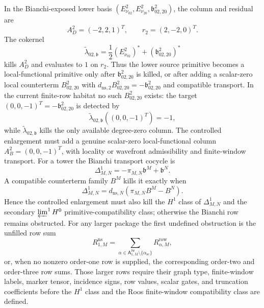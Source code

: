 \begin{stmt}
\begin{enumerate}[label=(\arabic*)]
\[    \]
    In the Bianchi-exposed lower basis
    \((E^2_{\nu_{02}},E^2_{\nu_{20}},\mathfrak b^2_{02,20})\), the column
    and residual are
    \[
      A_D^2=(-2,2,1)^T,\qquad r_2=(2,-2,0)^T .
    \]
    The cokernel
    \[
      \widetilde\lambda_{02,\mathfrak b}
      =
      \frac12(E^2_{\nu_{02}})^*
      +(\mathfrak b^2_{02,20})^*
    \]
    kills \(A_D^2\) and evaluates to \(1\) on \(r_2\).  Thus the lower
    source primitive becomes a local-functional primitive only after
    \(\mathfrak b^2_{02,20}\) is killed, or after adding a scalar-zero
    local counterterm \(B^2_{02,20}\) with
    \(d_{\mathrm{ns},2}B^2_{02,20}=-\mathfrak b^2_{02,20}\) and
    compatible transport.  In the current finite-row habitat no such
    \(B^2_{02,20}\) exists: the target
    \((0,0,-1)^T=-\mathfrak b^2_{02,20}\) is detected by
    \[
      \widetilde\lambda_{02,\mathfrak b}((0,0,-1)^T)=-1,
    \]
    while \(\widetilde\lambda_{02,\mathfrak b}\) kills the only available
    degree-zero column.  The controlled enlargement must add a genuine
    scalar-zero local-functional column
    \(A_B^2=(0,0,-1)^T\), with locality or wavefront admissibility and
    finite-window transport.  For a tower the Bianchi transport cocycle is
    \[
      \Delta^1_{M,N}
      =
      -\pi_{M,N}\mathfrak b^M+\mathfrak b^N .
    \]
    A compatible counterterm family \(B^M\) kills it exactly when
    \[
      \Delta^1_{M,N}
      =
      d_{\mathrm{ns},N}(\pi_{M,N}B^M-B^N).
    \]
    Hence the controlled enlargement must also kill the \(H^1\) class of
    \(\Delta^1_{M,N}\) and the secondary
    \(\varprojlim^1H^0\) primitive-compatibility class; otherwise the
    Bianchi row remains obstructed.
    For any larger package the first undefined obstruction is the
    unfilled row sum
    \[
      R^{\mathrm{ns}}_{1,M}
      =
      \sum_{\alpha\in
      \mathsf A^{\mathrm{fw}}_{1,M}\setminus\{\alpha_{\mathrm{sc}}\}}
      R^{\mathrm{row}}_{\alpha,M},
    \]
    or, when no nonzero order-one row is supplied, the corresponding
    order-two and order-three row sums.  Those larger rows require their
    graph type, finite-window labels, marker tensor, incidence signs, row
    values, scalar gates, and truncation coefficients before the
    \(H^1\) class and the Roos finite-window compatibility class are
    defined.


\end{enumerate}
\end{stmt}
